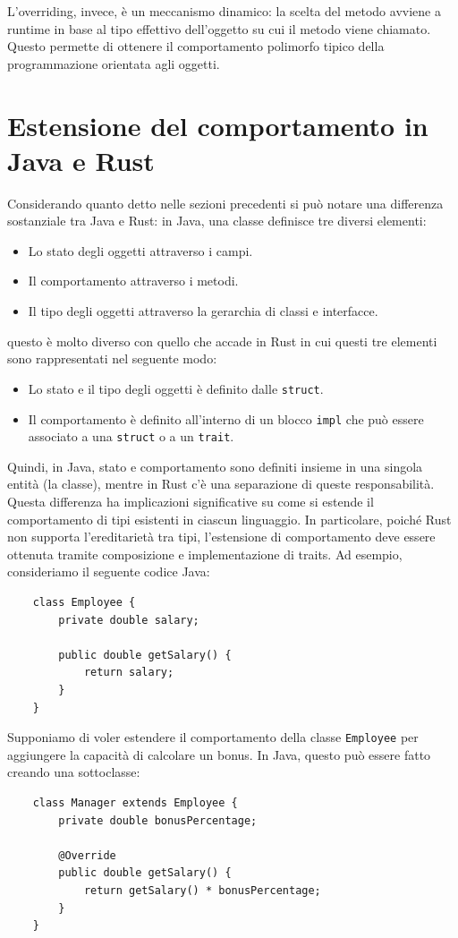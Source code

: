 L'overriding, invece, è un meccanismo dinamico: la scelta del metodo avviene a runtime in base al tipo effettivo dell'oggetto su cui il metodo viene chiamato. Questo permette di ottenere il comportamento polimorfo tipico della programmazione orientata agli oggetti. 
\section{Estensione del comportamento in Java e Rust}
Considerando quanto detto nelle sezioni precedenti si può notare una differenza sostanziale tra Java e Rust: in Java, una classe definisce tre diversi elementi:
\begin{itemize}
    \item Lo stato degli oggetti attraverso i campi.
    \item Il comportamento attraverso i metodi.
    \item Il tipo degli oggetti attraverso la gerarchia di classi e interfacce.
\end{itemize}
questo è molto diverso con quello che accade in Rust in cui questi tre elementi sono rappresentati nel seguente modo:
\begin{itemize}
    \item Lo stato e il tipo degli oggetti è definito dalle \texttt{struct}.
    \item Il comportamento è definito all'interno di un blocco \texttt{impl} che può essere associato a una \texttt{struct} o a un \texttt{trait}.
\end{itemize}
Quindi, in Java, stato e comportamento sono definiti insieme in una singola entità (la classe), mentre in Rust c'è una separazione di queste responsabilità. Questa differenza ha implicazioni significative su come si estende il comportamento di tipi esistenti in ciascun linguaggio. In particolare, poiché Rust non supporta l'ereditarietà tra tipi, l'estensione di comportamento deve essere ottenuta tramite composizione e implementazione di traits. Ad esempio, consideriamo il seguente codice Java:
\begin{verbatim}
    class Employee {
        private double salary;
        
        public double getSalary() {
            return salary;
        }
    }
\end{verbatim}
Supponiamo di voler estendere il comportamento della classe \texttt{Employee} per aggiungere la capacità di calcolare un bonus. In Java, questo può essere fatto creando una sottoclasse:
\begin{verbatim}
    class Manager extends Employee {
        private double bonusPercentage;

        @Override
        public double getSalary() {
            return getSalary() * bonusPercentage;
        }
    }
\end{verbatim}
